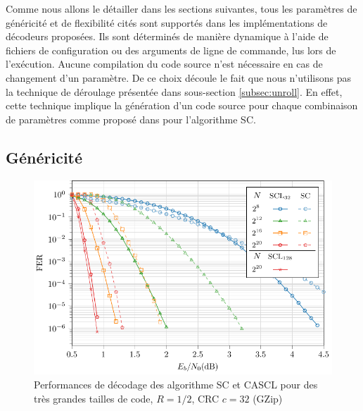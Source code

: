 Comme nous allons le détailler dans les sections suivantes, tous les paramètres de généricité et de flexibilité cités sont supportés dans les implémentations de décodeurs proposées. Ils sont déterminés de manière dynamique à l'aide de fichiers de configuration ou des arguments de ligne de commande, lus lors de l'exécution. Aucune compilation du code source n'est nécessaire en cas de changement d'un paramètre. De ce choix découle le fait que nous n'utilisons pas la technique de déroulage présentée dans sous-section \ref{subsec:unroll}. En effet, cette technique implique la génération d'un code source pour chaque combinaison de paramètres comme proposé dans \cite{sarkis_autogenerating_2014} pour l'algorithme SC.

\subsection{Généricité}

\begin{figure}[t]
\includegraphics[width=\textwidth]{main/ch2_fig/curves/code/tikz/code}
\caption{Performances de décodage des algorithme SC et CASCL pour des très grandes tailles de code, $R=1/2$, CRC $c=32$ (GZip)}
\label{fig:large_scl}
\end{figure}

